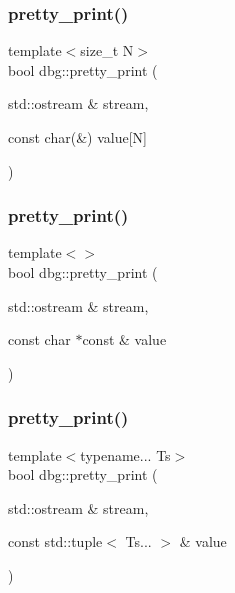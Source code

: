 \subsubsection{\texorpdfstring{pretty\+\_\+print()}{pretty\_print()}\hspace{0.1cm}{\footnotesize\ttfamily [9/19]}}
{\footnotesize\ttfamily template$<$size\+\_\+t N$>$ \\
bool dbg\+::pretty\+\_\+print (\begin{DoxyParamCaption}\item[{std\+::ostream \&}]{stream,  }\item[{const char(\&)}]{value\mbox{[}\+N\mbox{]} }\end{DoxyParamCaption})\hspace{0.3cm}{\ttfamily [inline]}}

\mbox{\label{namespacedbg_a17cebbee60948a473318356a59d7f825}} 
\subsubsection{\texorpdfstring{pretty\+\_\+print()}{pretty\_print()}\hspace{0.1cm}{\footnotesize\ttfamily [10/19]}}
{\footnotesize\ttfamily template$<$$>$ \\
bool dbg\+::pretty\+\_\+print (\begin{DoxyParamCaption}\item[{std\+::ostream \&}]{stream,  }\item[{const char $\ast$const \&}]{value }\end{DoxyParamCaption})\hspace{0.3cm}{\ttfamily [inline]}}

\mbox{\label{namespacedbg_a48e38a2e7f91709c4eac1c3ff1532f35}} 
\subsubsection{\texorpdfstring{pretty\+\_\+print()}{pretty\_print()}\hspace{0.1cm}{\footnotesize\ttfamily [11/19]}}
{\footnotesize\ttfamily template$<$typename... Ts$>$ \\
bool dbg\+::pretty\+\_\+print (\begin{DoxyParamCaption}\item[{std\+::ostream \&}]{stream,  }\item[{const std\+::tuple$<$ Ts... $>$ \&}]{value }\end{DoxyParamCaption})\hspace{0.3cm}{\ttfamily [inline]}}

